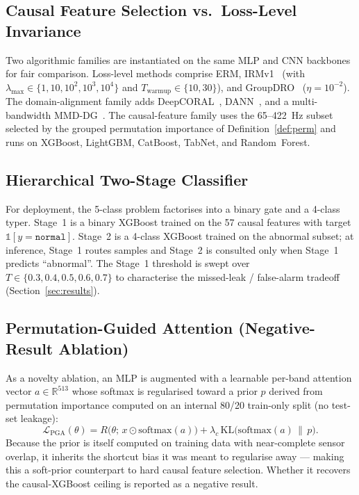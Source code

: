 \documentclass[3p,times,authoryear]{elsarticle}
\theoremstyle{remark}
\begin{document}
\subsection{Causal Feature Selection vs.\ Loss-Level Invariance}

Two algorithmic families are instantiated on the same MLP and
CNN backbones for fair comparison. Loss-level methods comprise
ERM, IRMv1~\cite{arjovsky2019irm} (with
$\lambda_{\max} \in \{1, 10, 10^{2}, 10^{3}, 10^{4}\}$ and
$T_{\mathrm{warmup}} \in \{10, 30\}$), and
GroupDRO~\cite{sagawa2020groupdro} ($\eta = 10^{-2}$). The
domain-alignment family adds DeepCORAL~\cite{sun2016coral},
DANN~\cite{ganin2016dann}, and a multi-bandwidth
MMD-DG~\cite{long2015dan,li2018mmddg}. The causal-feature
family uses the 65--422~Hz subset selected by the grouped
permutation importance of Definition~\ref{def:perm} and runs
on XGBoost, LightGBM, CatBoost, TabNet, and Random~Forest.

\subsection{Hierarchical Two-Stage Classifier}\label{sec:method-hier}

For deployment, the 5-class problem factorises into a binary
gate and a 4-class typer. Stage~1 is a binary XGBoost trained
on the 57 causal features with target $\mathbb{1}[y=\texttt{normal}]$.
Stage~2 is a 4-class XGBoost trained on the abnormal subset; at
inference, Stage~1 routes samples and Stage~2 is consulted only
when Stage~1 predicts ``abnormal''. The Stage~1 threshold is
swept over $T \in \{0.3, 0.4, 0.5, 0.6, 0.7\}$ to characterise
the missed-leak / false-alarm tradeoff
(Section~\ref{sec:results}).

\subsection{Permutation-Guided Attention (Negative-Result Ablation)}\label{sec:method-pga}

As a novelty ablation, an MLP is augmented with a learnable
per-band attention vector $a \in \mathbb{R}^{513}$ whose softmax
is regularised toward a prior $p$ derived from permutation
importance computed on an internal 80/20 train-only split (no
test-set leakage):
\[
\mathcal{L}_{\mathrm{PGA}}(\theta)
= R\bigl(\theta;\, x \odot \mathrm{softmax}(a)\bigr)
+ \lambda_c\,\mathrm{KL}\!\bigl(\mathrm{softmax}(a) \,\|\, p\bigr).
\]
Because the prior is itself computed on training data with
near-complete sensor overlap, it inherits the shortcut bias it
was meant to regularise away --- making this a soft-prior
counterpart to hard causal feature selection. Whether it
recovers the causal-XGBoost ceiling is reported as a negative
result.
\end{document}
